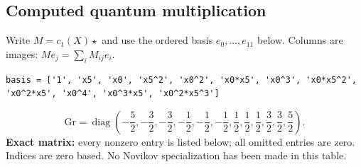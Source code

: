 \documentclass[10pt,a4paper]{article}
\begin{document}
\subsection*{Computed quantum multiplication}
Write $M=c_1(X)\star$ and use the ordered basis $e_0,\ldots,e_{11}$ below. Columns are images: $M e_j=\sum_i M_{ij}e_i$.
\begin{lstlisting}
basis = ['1', 'x5', 'x0', 'x5^2', 'x0^2', 'x0*x5', 'x0^3', 'x0*x5^2', 'x0^2*x5', 'x0^4', 'x0^3*x5', 'x0^2*x5^3']
\end{lstlisting}
\[\mathrm{Gr}=\operatorname{diag}\!\left(- \frac{5}{2},- \frac{3}{2},- \frac{3}{2},- \frac{1}{2},- \frac{1}{2},- \frac{1}{2},\frac{1}{2},\frac{1}{2},\frac{1}{2},\frac{3}{2},\frac{3}{2},\frac{5}{2}\right).\]
\textbf{Exact matrix:} every nonzero entry is listed below; all omitted entries are zero. Indices are zero based. No Novikov specialization has been made in this table.
\end{document}
